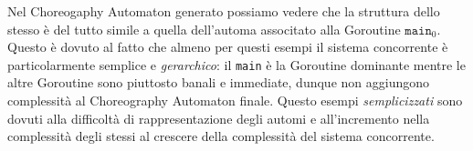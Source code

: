 Nel Choreogaphy Automaton generato possiamo vedere che la struttura dello stesso è del tutto simile a quella dell'automa associtato alla Goroutine $\texttt{main}_0$. Questo è dovuto al fatto che almeno per questi esempi il sistema concorrente è particolarmente semplice e \emph{gerarchico}: il \texttt{main} è la Goroutine dominante mentre le altre Goroutine sono piuttosto banali e immediate, dunque non aggiungono complessità al Choreography Automaton finale. Questo esempi \emph{semplicizzati} sono dovuti alla difficoltà di rappresentazione degli automi e all'incremento nella complessità degli stessi al crescere della complessità del sistema concorrente.
\begin{figure}[h!]
\end{figure}


